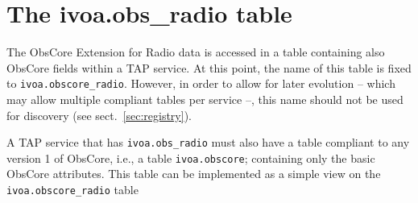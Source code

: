 \documentclass[11pt,a4paper]{ivoa}
\begin{document}
\section{The ivoa.obs\_radio table}
\label{sec:implementation}
%
%
%
The ObsCore Extension for Radio data is accessed in a table containing also ObsCore fields within a TAP
\citep{2019ivoa.spec.0927D} service. At this
point, the name of this table is fixed to \verb|ivoa.obscore_radio|.
However, in order to allow for later evolution -- which may allow
multiple compliant tables per service --, this name should not be used
for discovery (see sect.~\ref{sec:registry}).

A TAP service that has \verb|ivoa.obs_radio| must also have a table
compliant to any version 1 of ObsCore, i.e., a table
\verb|ivoa.obscore|; containing only the basic ObsCore attributes.
This table can be implemented as a simple view on the \verb|ivoa.obscore_radio|
table
\end{document}

